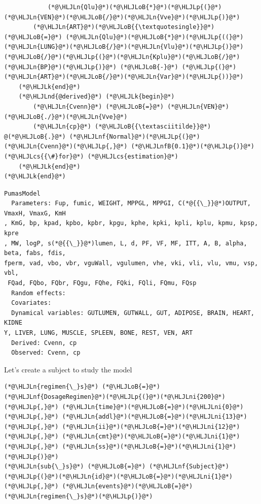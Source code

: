\documentclass[12pt,a4paper]{article}
\newcommand{\HLJLk}[1]{\textcolor[RGB]{148,91,176}{\textbf{#1}}}
\newcommand{\HLJLn}[1]{#1}
\newcommand{\HLJLnd}[1]{\textcolor[RGB]{214,102,97}{#1}}
\newcommand{\HLJLnf}[1]{\textcolor[RGB]{66,102,213}{#1}}
\newcommand{\HLJLnfB}[1]{\textcolor[RGB]{59,151,46}{#1}}
\newcommand{\HLJLni}[1]{\textcolor[RGB]{59,151,46}{#1}}
\newcommand{\HLJLoB}[1]{\textcolor[RGB]{102,102,102}{\textbf{#1}}}
\newcommand{\HLJLp}[1]{#1}
\newcommand{\HLJLcs}[1]{\textcolor[RGB]{153,153,119}{\textit{#1}}}
\begin{document}
\begin{lstlisting}
            (*@\HLJLn{Qlu}@*)(*@\HLJLoB{*}@*)(*@\HLJLp{(}@*)(*@\HLJLn{VEN}@*)(*@\HLJLoB{/}@*)(*@\HLJLn{Vve}@*)(*@\HLJLp{)}@*)
        (*@\HLJLn{ART}@*)(*@\HLJLoB{{\textquotesingle}}@*) (*@\HLJLoB{=}@*) (*@\HLJLn{Qlu}@*)(*@\HLJLoB{*}@*)(*@\HLJLp{((}@*)(*@\HLJLn{LUNG}@*)(*@\HLJLoB{/}@*)(*@\HLJLn{Vlu}@*)(*@\HLJLp{)}@*)(*@\HLJLoB{/}@*)(*@\HLJLp{(}@*)(*@\HLJLn{Kplu}@*)(*@\HLJLoB{/}@*)(*@\HLJLn{BP}@*)(*@\HLJLp{)}@*) (*@\HLJLoB{-}@*) (*@\HLJLp{(}@*)(*@\HLJLn{ART}@*)(*@\HLJLoB{/}@*)(*@\HLJLn{Var}@*)(*@\HLJLp{))}@*)
    (*@\HLJLk{end}@*)
    (*@\HLJLnd{@derived}@*) (*@\HLJLk{begin}@*)
        (*@\HLJLn{Cvenn}@*) (*@\HLJLoB{=}@*) (*@\HLJLn{VEN}@*)(*@\HLJLoB{./}@*)(*@\HLJLn{Vve}@*)
        (*@\HLJLn{cp}@*) (*@\HLJLoB{{\textasciitilde}}@*) @(*@\HLJLoB{.}@*) (*@\HLJLnf{Normal}@*)(*@\HLJLp{(}@*)(*@\HLJLn{Cvenn}@*)(*@\HLJLp{,}@*) (*@\HLJLnfB{0.1}@*)(*@\HLJLp{)}@*) (*@\HLJLcs{{\#}for}@*) (*@\HLJLcs{estimation}@*)
    (*@\HLJLk{end}@*)
(*@\HLJLk{end}@*)
\end{lstlisting}

\begin{lstlisting}
PumasModel
  Parameters: Fup, fumic, WEIGHT, MPPGL, MPPGI, C(*@{{\_}}@*)OUTPUT, VmaxH, VmaxG, KmH
, KmG, bp, kpad, kpbo, kpbr, kpgu, kphe, kpki, kpli, kplu, kpmu, kpsp, kpre
, MW, logP, s(*@{{\_}}@*)lumen, L, d, PF, VF, MF, ITT, A, B, alpha, beta, fabs, fdis, 
fperm, vad, vbo, vbr, vguWall, vgulumen, vhe, vki, vli, vlu, vmu, vsp, vbl,
 FQad, FQbo, FQbr, FQgu, FQhe, FQki, FQli, FQmu, FQsp
  Random effects: 
  Covariates: 
  Dynamical variables: GUTLUMEN, GUTWALL, GUT, ADIPOSE, BRAIN, HEART, KIDNE
Y, LIVER, LUNG, MUSCLE, SPLEEN, BONE, REST, VEN, ART
  Derived: Cvenn, cp
  Observed: Cvenn, cp
\end{lstlisting}


Let's create a subject to study the model


\begin{lstlisting}
(*@\HLJLn{regimen{\_}s}@*) (*@\HLJLoB{=}@*) (*@\HLJLnf{DosageRegimen}@*)(*@\HLJLp{(}@*)(*@\HLJLni{200}@*)(*@\HLJLp{,}@*) (*@\HLJLn{time}@*)(*@\HLJLoB{=}@*)(*@\HLJLni{0}@*)(*@\HLJLp{,}@*) (*@\HLJLn{addl}@*)(*@\HLJLoB{=}@*)(*@\HLJLni{13}@*)(*@\HLJLp{,}@*) (*@\HLJLn{ii}@*)(*@\HLJLoB{=}@*)(*@\HLJLni{12}@*)(*@\HLJLp{,}@*) (*@\HLJLn{cmt}@*)(*@\HLJLoB{=}@*)(*@\HLJLni{1}@*)(*@\HLJLp{,}@*) (*@\HLJLn{ss}@*)(*@\HLJLoB{=}@*)(*@\HLJLni{1}@*)(*@\HLJLp{)}@*)
(*@\HLJLn{sub{\_}s}@*) (*@\HLJLoB{=}@*) (*@\HLJLnf{Subject}@*)(*@\HLJLp{(}@*)(*@\HLJLn{id}@*)(*@\HLJLoB{=}@*)(*@\HLJLni{1}@*)(*@\HLJLp{,}@*) (*@\HLJLn{events}@*)(*@\HLJLoB{=}@*)(*@\HLJLn{regimen{\_}s}@*)(*@\HLJLp{)}@*)
\end{lstlisting}
\end{document}
